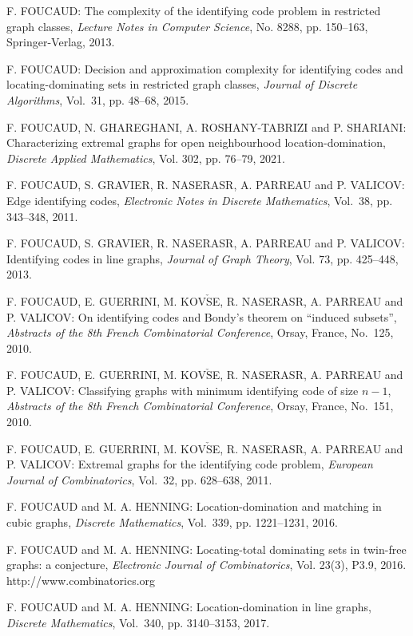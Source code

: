 \begin{thebibliography}{999}
F. FOUCAUD: The complexity of the  identifying code problem in restricted graph classes, {\it Lecture Notes in Computer Science}, No. 8288, pp. 150--163, Springer-Verlag, 2013.

F. FOUCAUD: Decision and approximation complexity for identifying codes and locating-dominating sets in restricted graph classes, {\it Journal of Discrete Algorithms}, Vol.~31, pp. 48--68, 2015.

F. FOUCAUD, N. GHAREGHANI, A. ROSHANY-TABRIZI and P. SHARIANI: Characterizing extremal graphs for open neighbourhood location-domination, {\it Discrete Applied Mathematics}, Vol. 302, pp. 76--79, 2021.

F. FOUCAUD, S. GRAVIER, R. NASERASR, A. PARREAU and P. VALICOV: Edge identifying codes, {\it Electronic Notes in Discrete Mathematics}, Vol.~38, pp. 343--348, 2011.

F. FOUCAUD, S. GRAVIER, R. NASERASR, A. PARREAU and P. VALICOV: Identifying codes in line graphs, {\it Journal of Graph Theory}, Vol. 73, pp. 425--448, 2013.

F. FOUCAUD, E. GUERRINI, M. KOV$\check{\textrm{S}}$E, R. NASERASR, A. PARREAU and P. VALICOV: On identifying codes and Bondy's theorem on ``induced subsets'', {\it Abstracts of the 8th French Combinatorial Conference}, Orsay, France, No.~125, 2010.

F. FOUCAUD, E. GUERRINI, M. KOV$\check{\textrm{S}}$E, R. NASERASR, A. PARREAU and P. VALICOV: Classifying graphs with minimum identifying code of size $n-1$, {\it Abstracts of the 8th French Combinatorial Conference}, Orsay, France, No.~151, 2010.

F. FOUCAUD, E. GUERRINI, M. KOV$\check{\textrm{S}}$E, R. NASERASR, A. PARREAU and P. VALICOV: Extremal graphs for the identifying code problem, {\it European Journal of Combinatorics}, Vol.~32, pp. 628--638, 2011.

F. FOUCAUD and M. A. HENNING: Location-domination and matching in cubic graphs, {\it Discrete Mathematics}, Vol.~339, pp. 1221--1231, 2016.

F. FOUCAUD and M. A. HENNING: Locating-total dominating sets in twin-free graphs: a conjecture, {\it Electronic Journal of Combinatorics}, Vol. 23(3), P3.9, 2016.\\
http://www.combinatorics.org

F. FOUCAUD and M. A. HENNING: Location-domination in line graphs, {\it Discrete Mathematics}, Vol.~340, pp. 3140--3153, 2017.


\end{thebibliography}
